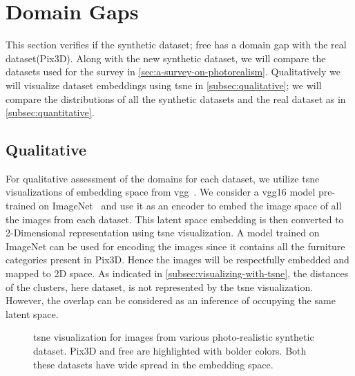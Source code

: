 \section{Domain Gaps}\label{sec:domain-gaps}

This section verifies if the synthetic dataset; \gls{free} has a domain gap with the real dataset(Pix3D).
Along with the new synthetic dataset, we will compare the datasets used for the survey in \autoref{sec:a-survey-on-photorealism}.
Qualitatively we will visualize dataset embeddings using \gls{tsne} in \autoref{subsec:qualitative}; we will compare the distributions of all the synthetic datasets and the real dataset as in \autoref{subsec:quantitative}.

\subsection{Qualitative}\label{subsec:qualitative}

For qualitative assessment of the domains for each dataset, we utilize \gls{tsne} visualizations of embedding space from \gls{vgg}~\cite{simonyan2015deep}.
We consider a \gls{vgg}16 model pre-trained on ImageNet~\cite{Deng2009ImageNetAL} and use it as an encoder to embed the image space of all the images from each dataset.
This latent space embedding is then converted to 2-Dimensional representation using \gls{tsne} visualization.
A model trained on ImageNet can be used for encoding the images since it contains all the furniture categories present in Pix3D\@.
Hence the images will be respectfully embedded and mapped to 2D space.
As indicated in \autoref{subsec:visualizing-with-tsne}, the distances of the clusters, here dataset, is not represented by the \gls{tsne} visualization.
However, the overlap can be considered as an inference of occupying the same latent space.

\begin{figure}[ht]
    \centering
    \resizebox{0.9\textwidth}{8.5cm}{}
    \caption[\gls{tsne} for Photorealistic Synthetic datasets.]{\gls{tsne} visualization for images from various photo-realistic synthetic dataset. Pix3D and \gls{free} are highlighted with bolder colors.
    Both these datasets have wide spread in the embedding space.}
    \label{fig:photorealistic tsne}
\end{figure}

